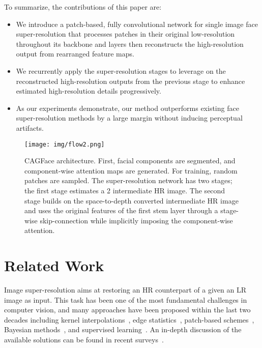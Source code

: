 \documentclass[10pt,twocolumn,letterpaper]{article}
\begin{document}
To summarize, the contributions of this paper are: 
\vspace{-1mm}
\begin{itemize}
\item  We introduce a patch-based, fully convolutional network for single image face super-resolution that processes patches in their original low-resolution throughout its backbone and layers then reconstructs the high-resolution output from rearranged feature maps.        
\vspace{-2mm}

\item We recurrently apply the super-resolution stages to leverage on the reconstructed high-resolution outputs from the previous stage to enhance estimated high-resolution details progressively. 
\vspace{-2mm}

\item As our experiments demonstrate, our method outperforms existing face super-resolution methods by a large margin without inducing perceptual artifacts. 


\end{itemize}

\begin{figure*}[t]
\begin{center}
\texttt{[image: img/flow2.png]}
\end{center}
\caption{CAGFace architecture. First, facial components are segmented, and component-wise attention maps are generated. For training, random patches are sampled. The super-resolution network has two stages; the first stage estimates a 2 intermediate HR image. The second stage builds on the space-to-depth converted intermediate HR image and uses the original features of the first stem layer through a stage-wise skip-connection while implicitly imposing the component-wise attention. }
\label{fig:architecture}
\end{figure*}

 


 
\section{Related Work}\label{sec:literature}

Image super-resolution aims at restoring an HR counterpart of a given an LR image as input. This task has been one of the most fundamental challenges in computer vision, and many approaches have been proposed within the last two decades including kernel interpolations~\cite{lehmann1999survey}, edge statistics~\cite{fattal2007image, sun2008image}, patch-based  schemes~\cite{freeman2002example, wang2005patch, irani2009super, freedman2011image, yang2012coupled, yang2013fast, huang2015single, sajjadi2017enhancenet}, Bayesian methods~\cite{sun2003image,kim2010single,shan2008fast}, and supervised learning~\cite{aly2005image, ni2007image, zhang2010non}. An in-depth discussion of the available solutions can be found in recent surveys~\cite{yue2016,hayat2018,yang2019}. 
\end{document}
